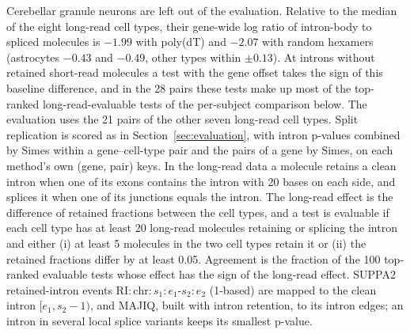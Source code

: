 \documentclass[11pt]{article}
\begin{document}
Cerebellar granule neurons are left out of the evaluation. Relative to the median of the eight long-read cell types, their gene-wide log ratio of intron-body to spliced molecules is $-1.99$ with poly(dT) and $-2.07$ with random hexamers (astrocytes $-0.43$ and $-0.49$, other types within $\pm0.13$). At introns without retained short-read molecules a test with the gene offset takes the sign of this baseline difference, and in the 28 pairs these tests make up most of the top-ranked long-read-evaluable tests of the per-subject comparison below. The evaluation uses the 21 pairs of the other seven long-read cell types. Split replication is scored as in Section~\ref{sec:evaluation}, with intron p-values combined by Simes within a gene--cell-type pair and the pairs of a gene by Simes, on each method's own (gene, pair) keys. In the long-read data a molecule retains a clean intron when one of its exons contains the intron with 20 bases on each side, and splices it when one of its junctions equals the intron. The long-read effect is the difference of retained fractions between the cell types, and a test is evaluable if each cell type has at least 20 long-read molecules retaining or splicing the intron and either (i) at least 5 molecules in the two cell types retain it or (ii) the retained fractions differ by at least 0.05. Agreement is the fraction of the 100 top-ranked evaluable tests whose effect has the sign of the long-read effect. SUPPA2 retained-intron events $\mathrm{RI}{:}\mathrm{chr}{:}s_1{:}e_1\text{-}s_2{:}e_2$ (1-based) are mapped to the clean intron $[e_1,s_2-1)$, and MAJIQ, built with intron retention, to its intron edges; an intron in several local splice variants keeps its smallest p-value.
\end{document}
